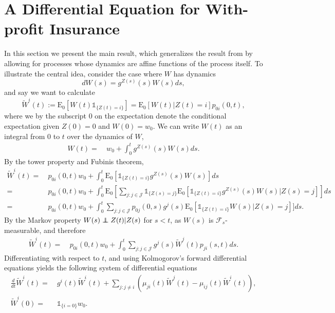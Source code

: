 \documentclass[12pt]{article}
\newcommand{\E}{\text{E}}
\newcommand{\indic}[1]{\mathds{1}_{ \{ #1 \} }}
\newcommand\independent{\protect\mathpalette{\protect\independenT}{\perp}}
\def\independenT#1#2{\mathrel{\rlap{$#1#2$}\mkern2mu{#1#2}}}
\theoremstyle{my_thm}
\theoremstyle{my_rem}
\begin{document}
\section{A Differential Equation for With-profit Insurance} \label{sec:diff}
In this section we present the main result, which generalizes the result from \citet{Norberg} by allowing for processes whose dynamics are affine functions of the process itself. To illustrate the central idea, consider the case where $W$ has dynamics
$$
dW(s)=g^{Z(s)}(s) W(s) ds,
$$
and say we want to calculate 
$$
\tilde{W}^i(t):=\E_0[W(t)\indic{Z(t)=i}]
=\E_0[W(t)|Z(t)=i]p_{0i}(0,t),
$$ 
where we by the subscript 0 on the expectation denote the conditional expectation given $Z(0)=0$ and $W(0)=w_0$. We can write $W(t)$ as an integral from 0 to $t$ over the dynamics of $W$,
\begin{align*}
W(t)
= \ & w_0+\int_0^t  g^{Z(s)}(s) W(s) ds.
\end{align*}
By the tower property and Fubinis theorem,
\begin{align*}
\tilde{W}^i(t)
= \ &  p_{0i}(0,t) w_0 +
\int_0^t \E_0[ \indic{Z(t)=i}  g^{Z(s)}(s) W(s)] ds
\\
= \ &   p_{0i}(0,t) w_0 +
\int_0^t \E_0 \left[ \sum_{j:j \in \mathcal{J}} \indic{Z(s)=j}\E_0[ \indic{Z(t)=i}    g^{Z(s)}(s) W(s)|Z(s)=j] \right] ds\\
= \ &   p_{0i}(0,t) w_0+
\int_0^t  \sum_{j:j \in \mathcal{J}} p_{0j}(0,s)g^{j}(s)  \E_0[ \indic{Z(t)=i} W(s)|Z(s)=j]] ds.
\end{align*}
By the Markov property $W(s)\independent Z(t)|Z(s)$ for $s<t$, as $W(s)$ is $\mathcal{F}_s$-measurable, and therefore
\begin{align*}
\tilde{W}^i(t)= \ &  p_{0i}(0,t) w_0 +
\int_0^t  \sum_{j:j \in \mathcal{J}} g^{j}(s)  \tilde{W}^j(t) p_{ji}(s,t)ds.
\end{align*}
Differentiating with respect to $t$, and using Kolmogorov's forward differential equations yields the following system of differential equations
\begin{align*}
\frac{d}{dt} \tilde{W}^i(t)= \ & g^i(t) \tilde{W}^i(t)+ \sum_{j:j\neq i} \left( \mu_{ji}(t)\tilde{W}^j(t)-\mu_{ij}(t)\tilde{W}^i(t)\right),
\\
\tilde{W}^i(0)= \ &\indic{i=0}w_0.
\end{align*}
\end{document}
